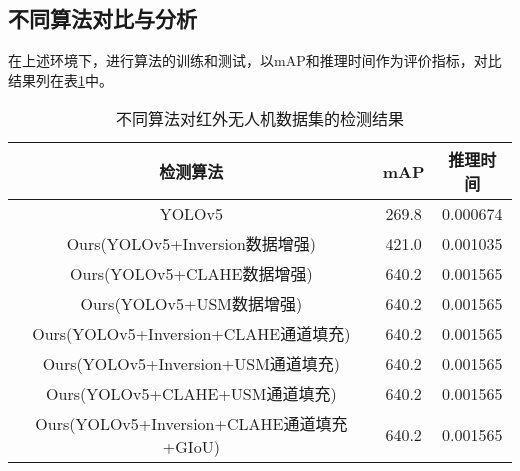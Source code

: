 \subsection{不同算法对比与分析}
在上述环境下，进行算法的训练和测试，以mAP和推理时间作为评价指标，对比结果列在表\ref{metric1}中。

\begin{table}[htbp]
  \caption{不同算法对红外无人机数据集的检测结果}
  \vspace{0.5em}\centering\wuhao
  \begin{tabular}{ccc}
  \toprule
  检测算法 & mAP & 推理时间\\
  \midrule
  YOLOv5 & 269.8 & 0.000674\\
  Ours(YOLOv5+Inversion数据增强) & 421.0 & 0.001035\\
  Ours(YOLOv5+CLAHE数据增强) & 640.2 & 0.001565\\
  Ours(YOLOv5+USM数据增强) & 640.2 & 0.001565\\
  Ours(YOLOv5+Inversion+CLAHE通道填充) & 640.2 & 0.001565\\
  Ours(YOLOv5+Inversion+USM通道填充) & 640.2 & 0.001565\\
  Ours(YOLOv5+CLAHE+USM通道填充) & 640.2 & 0.001565\\
  Ours(YOLOv5+Inversion+CLAHE通道填充+GIoU) & 640.2 & 0.001565\\
  \bottomrule
  \end{tabular}
  \label{metric1}
\end{table}




